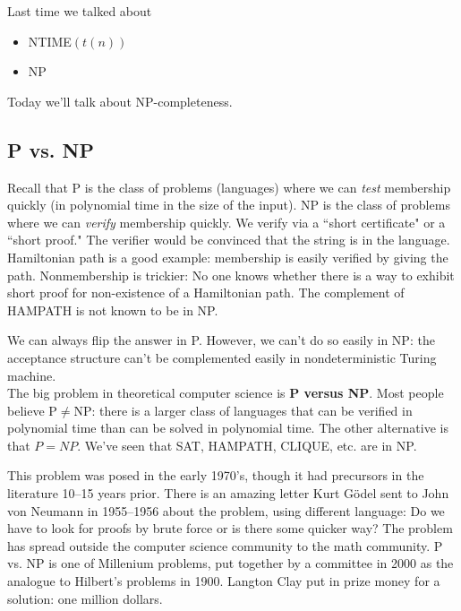 
Last time we talked about
\begin{itemize}
\item
NTIME$(t(n))$
\item
NP
\end{itemize}
Today we'll talk about NP-completeness.

\subsection{P vs. NP}

Recall that P is the class of problems (languages) where we can {\it test} membership quickly (in polynomial time in the size of the input). NP is the class of problems where we can {\it verify} membership quickly. We verify via a ``short certificate" or a ``short proof." The verifier would be convinced that the string is in the language.
Hamiltonian path is a good example: membership is easily verified by giving the path. Nonmembership is trickier: No one knows whether there is a way to exhibit short proof for non-existence of a Hamiltonian path. The complement of HAMPATH is not known to be in NP. 

We can always flip the answer in P. However, we can't do so easily in NP: the acceptance structure can't be complemented easily in nondeterministic Turing machine. \\

\vskip0.15in
The big problem in theoretical computer science is \textbf{P versus NP}. Most people believe P$\ne$NP: there is a larger class of languages that can be verified in polynomial time than can be solved in polynomial time. The other alternative is that $P=NP$.
We've seen that SAT, HAMPATH, CLIQUE, etc. are in NP.


This problem was posed in the early 1970's, though it had precursors in the literature 10--15 years prior. There is an amazing letter Kurt G\"odel sent to John von Neumann in 1955--1956 about the problem, using different language: Do we have to look for proofs by brute force or is there some quicker way?
The problem has spread outside the computer science community to the math community. P vs. NP is one of Millenium problems, put together by a committee in 2000 as the analogue to Hilbert's problems in 1900. Langton Clay put in prize money for a solution: one million dollars.
